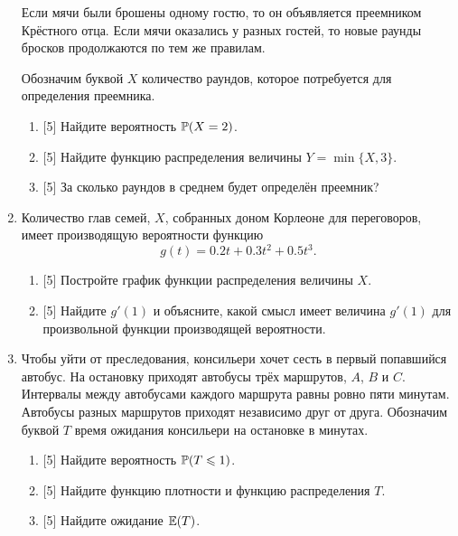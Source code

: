 \begin{enumerate}
  Если мячи были брошены одному гостю, то он объявляется преемником Крёстного отца. 
  Если мячи оказались у разных гостей, то новые раунды бросков продолжаются по тем же правилам. 
  
  Обозначим буквой $X$ количество раундов, которое потребуется для определения преемника. 
  
  \begin{enumerate}
      \item {[5]} Найдите вероятность $\P(X = 2)$. 
      \item {[5]} Найдите функцию распределения величины $Y = \min\{X, 3\}$.
      \item {[5]} За сколько раундов в среднем будет определён преемник?
  \end{enumerate}
  

  \item Количество глав семей, $X$, собранных доном Корлеоне для переговоров, имеет производящую вероятности функцию 
  \[
  g(t) = 0.2 t + 0.3 t^2 + 0.5 t^3.    
  \]
  \begin{enumerate}
      \item {[5]} Постройте график функции распределения величины $X$. 
      \item {[5]} Найдите $g'(1)$ и объясните, какой смысл имеет величина $g'(1)$ для произвольной функции производящей вероятности.
  \end{enumerate}
  
  \item Чтобы уйти от преследования, консильери хочет сесть в первый попавшийся автобус. 
  На остановку приходят автобусы трёх маршрутов, $A$, $B$ и $C$. 
  Интервалы между автобусами каждого маршрута равны ровно пяти минутам. 
  Автобусы разных маршрутов приходят независимо друг от друга. 
  Обозначим буквой $T$ время ожидания консильери на остановке в минутах.
  
  \begin{enumerate}
      \item {[5]} Найдите вероятность $\P(T \leq 1)$.
      \item {[5]} Найдите функцию плотности и функцию распределения $T$.
      \item {[5]} Найдите ожидание $\E(T)$.
  \end{enumerate}
  
  
  
  
\end{enumerate}
  
